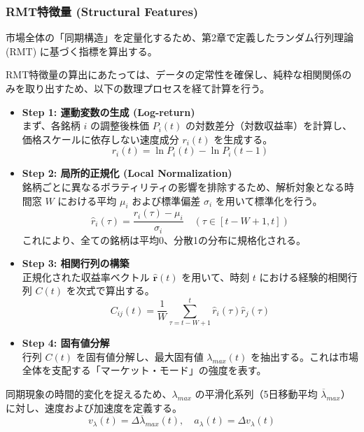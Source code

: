 \documentclass[11pt,a4paper,oneside]{ltjsarticle}
\begin{document}
\subsubsection{RMT特徴量 (Structural Features)}
市場全体の「同期構造」を定量化するため、第2章で定義したランダム行列理論 (RMT) に基づく指標を算出する。

RMT特徴量の算出にあたっては、データの定常性を確保し、純粋な相関関係のみを取り出すため、以下の数理プロセスを経て計算を行う。

\begin{itemize}
    \item \textbf{Step 1: 運動変数の生成 (Log-return)} \\
    まず、各銘柄 $i$ の調整後株価 $P_{i}(t)$ の対数差分（対数収益率）を計算し、価格スケールに依存しない速度成分 $r_{i}(t)$ を生成する。
    \begin{equation}
        r_{i}(t) = \ln P_{i}(t) - \ln P_{i}(t-1)
    \end{equation}

    \item \textbf{Step 2: 局所的正規化 (Local Normalization)} \\
    銘柄ごとに異なるボラティリティの影響を排除するため、解析対象となる時間窓 $W$ における平均 $\mu_{i}$ および標準偏差 $\sigma_{i}$ を用いて標準化を行う。
    \begin{equation}
        \hat{r}_{i}(\tau) = \frac{r_{i}(\tau) - \mu_{i}}{\sigma_{i}} \quad (\tau \in [t-W+1, t])
    \end{equation}
    これにより、全ての銘柄は平均0、分散1の分布に規格化される。

    \item \textbf{Step 3: 相関行列の構築} \\
    正規化された収益率ベクトル $\hat{\boldsymbol{r}}(t)$ を用いて、時刻 $t$ における経験的相関行列 $C(t)$ を次式で算出する。
    \begin{equation}
        C_{ij}(t) = \frac{1}{W} \sum_{\tau=t-W+1}^{t} \hat{r}_{i}(\tau) \hat{r}_{j}(\tau)
    \end{equation}

    \item \textbf{Step 4: 固有値分解} \\
    行列 $C(t)$ を固有値分解し、最大固有値 $\lambda_{max}(t)$ を抽出する。これは市場全体を支配する「マーケット・モード」の強度を表す。
\end{itemize}


同期現象の時間的変化を捉えるため、$\lambda_{max}$ の平滑化系列（5日移動平均 $\overline{\lambda}_{max}$）に対し、速度および加速度を定義する。
\begin{equation}
    v_{\lambda}(t) = \Delta \overline{\lambda}_{max}(t), \quad a_{\lambda}(t) = \Delta v_{\lambda}(t)
\end{equation}
\end{document}
